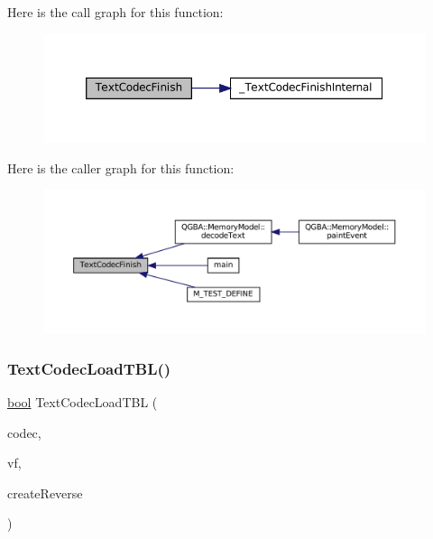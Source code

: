 Here is the call graph for this function\+:
\nopagebreak
\begin{figure}[H]
\begin{center}
\leavevmode
\includegraphics[width=350pt]{text-codec_8c_a9aeee69d7c95b369f219d0f5eb65a075_cgraph}
\end{center}
\end{figure}
Here is the caller graph for this function\+:
\nopagebreak
\begin{figure}[H]
\begin{center}
\leavevmode
\includegraphics[width=350pt]{text-codec_8c_a9aeee69d7c95b369f219d0f5eb65a075_icgraph}
\end{center}
\end{figure}
\mbox{\label{text-codec_8c_a64c21801885c3ff4c5d2d8c5377c1cd5}} 
\subsubsection{\texorpdfstring{Text\+Codec\+Load\+T\+B\+L()}{TextCodecLoadTBL()}}
{\footnotesize\ttfamily \mbox{\hyperlink{libretro_8h_a4a26dcae73fb7e1528214a068aca317e}{bool}} Text\+Codec\+Load\+T\+BL (\begin{DoxyParamCaption}\item[{struct Text\+Codec $\ast$}]{codec,  }\item[{struct V\+File $\ast$}]{vf,  }\item[{\mbox{\hyperlink{libretro_8h_a4a26dcae73fb7e1528214a068aca317e}{bool}}}]{create\+Reverse }\end{DoxyParamCaption})}

